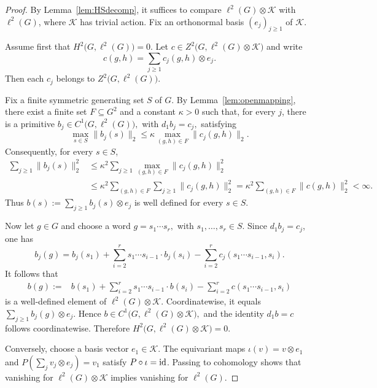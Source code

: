 \documentclass[12pt]{amsproc}
\theoremstyle{plain}
\theoremstyle{definition}
\numberwithin{equation}{section}
\begin{document}
\begin{proof}
By Lemma~\ref{lem:HSdecomp}, it suffices to compare
$\ell^2(G)\otimes\mathcal K$ with $\ell^2(G)$, where
$\mathcal K$ has trivial action. Fix an orthonormal basis
$(e_j)_{j\ge 1}$ of $\mathcal K$.

Assume first that
$
H^2\bigl(G,\ell^2(G)\bigr)=0.
$
Let
$
c\in Z^2\bigl(G,\ell^2(G)\otimes\mathcal K\bigr)
$
and write
\[
c(g,h)=\sum_{j\ge 1}c_j(g,h)\otimes e_j.
\]
Then each $c_j$ belongs to
$Z^2\bigl(G,\ell^2(G)\bigr)$.

Fix a finite symmetric generating set $S$ of $G$. By
Lemma~\ref{lem:openmapping}, there exist a finite set
$F\subseteq G^2$ and a constant $\kappa>0$ such that, for
every $j$, there is a primitive
$
b_j\in C^1\bigl(G,\ell^2(G)\bigr),$ with $
d_1b_j=c_j,$
satisfying
\[
\max_{s\in S}\|b_j(s)\|_2
\leq
\kappa\max_{(g,h)\in F}\|c_j(g,h)\|_2.
\]
Consequently, for every $s\in S$,
\[
\begin{aligned}
\sum_{j\ge 1}\|b_j(s)\|_2^2
&\leq
\kappa^2
\sum_{j\ge 1}
\max_{(g,h)\in F}\|c_j(g,h)\|_2^2 \\
&\leq
\kappa^2
\sum_{(g,h)\in F}
\sum_{j\ge 1}\|c_j(g,h)\|_2^2 
=
\kappa^2
\sum_{(g,h)\in F}\|c(g,h)\|_2^2
<\infty.
\end{aligned}
\]
Thus
$
b(s):=\sum_{j\ge 1}b_j(s)\otimes e_j
$
is well defined for every $s\in S$.

Now let $g\in G$ and choose a word
$
g=s_1\cdots s_r,$ with $
s_1,\ldots,s_r\in S.$
Since $d_1b_j=c_j$, one has
\[
b_j(g)
=
b_j(s_1)
+
\sum_{i=2}^r
s_1\cdots s_{i-1}\cdot b_j(s_i)
-
\sum_{i=2}^r
c_j(s_1\cdots s_{i-1},s_i).
\]
It follows that
\[
\begin{aligned}
b(g)
:={}&
b(s_1)
+
\sum_{i=2}^r
s_1\cdots s_{i-1}\cdot b(s_i)
-
\sum_{i=2}^r
c(s_1\cdots s_{i-1},s_i)
\end{aligned}
\]
is a well-defined element of
$\ell^2(G)\otimes\mathcal K$. Coordinatewise, it equals
$
\sum_{j\ge 1}b_j(g)\otimes e_j.
$
Hence
$
b\in C^1\bigl(G,\ell^2(G)\otimes\mathcal K\bigr),
$
and the identity $d_1b=c$ follows coordinatewise. Therefore
$
H^2\bigl(G,\ell^2(G)\otimes\mathcal K\bigr)=0.
$

Conversely, choose a basis vector $e_1\in\mathcal K$. The
equivariant maps
$
\iota(v)=v\otimes e_1
$
and
$
P\left(\sum_jv_j\otimes e_j\right)=v_1
$
satisfy $P\circ\iota={\rm id}$. Passing to cohomology shows that
vanishing for $\ell^2(G)\otimes\mathcal K$ implies vanishing
for $\ell^2(G)$.
\end{proof}
\end{document}
